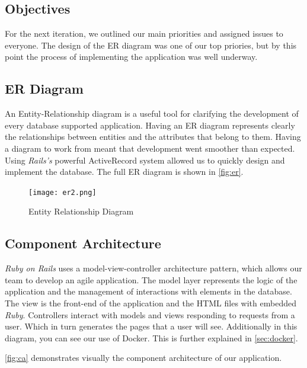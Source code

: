 \documentclass{l3proj}
\begin{document}
\subsection{Objectives}
\label{sec:design-objectives}

For the next iteration, we outlined our main priorities and assigned issues to everyone. The design of the ER diagram was one of our top priories, but by this point the process of implementing the application was well underway.

\subsection{ER Diagram}
\label{sec:er}

An Entity-Relationship diagram \cite{er} is a useful tool for clarifying the development of every database supported application. Having an ER diagram represents clearly the relationships between entities and the attributes that belong to them. Having a diagram to work from meant that development went smoother than expected. Using \textit{Rails's} powerful ActiveRecord system allowed us to quickly design and implement the database. The full ER diagram is shown in \autoref{fig:er}.

\begin{figure}
\centerline{\texttt{[image: er2.png]}}
\caption{Entity Relationship Diagram}
\label{fig:er}
\end{figure}

\subsection{Component Architecture}
\label{sec:component}

\textit{Ruby on Rails} uses a model-view-controller architecture pattern, which allows our team to develop an agile application. The model layer represents the logic of the application and the management of interactions with elements in the database. The view is the front-end of the application and the HTML files with embedded \textit{Ruby}. Controllers interact with models and views responding to requests from a user. Which in turn generates the pages that a user will see. Additionally in this diagram, you can see our use of Docker. This is further explained in \autoref{sec:docker}.

\autoref{fig:ca} demonstrates visually the component architecture of our application.
\end{document}
